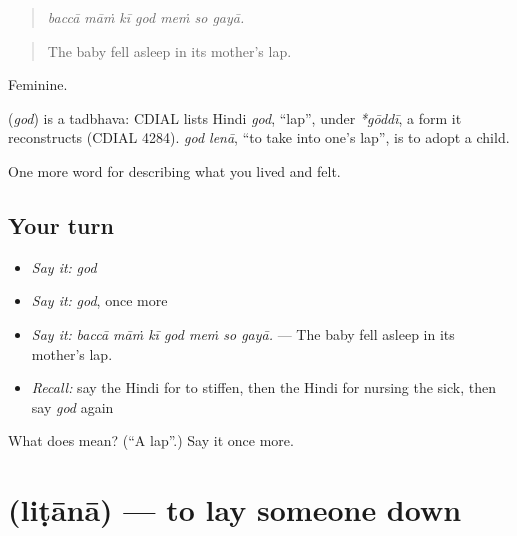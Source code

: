 \begin{quote}
      
\end{quote}

\begin{quote}
\emph{baccā māṁ kī god meṁ so gayā.}
\end{quote}

\begin{quote}
The baby fell asleep in its mother's lap.
\end{quote}

Feminine.

\begin{cousinweb}
\textbf{} (\emph{god}) is a tadbhava: CDIAL lists Hindi \emph{god}, \textquotedblleft{}lap\textquotedblright{}, under \emph{*gōddī}, a form it reconstructs (CDIAL 4284). \emph{god lenā}, \textquotedblleft{}to take into one's lap\textquotedblright{}, is to adopt a child.
\end{cousinweb}

\begin{grammarlens}[title={What you've built}]
One more word for describing what you lived and felt.
\end{grammarlens}

\subsection*{Your turn}
\begin{itemize}
\raggedright
  \item \emph{Say it:} \emph{god}
  \item \emph{Say it:} \emph{god}, once more
  \item \emph{Say it:} \emph{baccā māṁ kī god meṁ so gayā.} — The baby fell asleep in its mother's lap.
  \item \emph{Recall:} say the Hindi for to stiffen, then the Hindi for nursing the sick, then say \emph{god} again
\end{itemize}

\begin{tcolorbox}[breakable,colback=teal!4,colframe=teal!35!black,title={Before you move on}]
What does  mean? (\textquotedblleft{}A lap\textquotedblright{}.) Say it once more.
\end{tcolorbox}
\section[\texorpdfstring{\hi{लिटाना} (liṭānā)}{लिटाना (liṭānā)}]{ (liṭānā) — to lay someone down}

